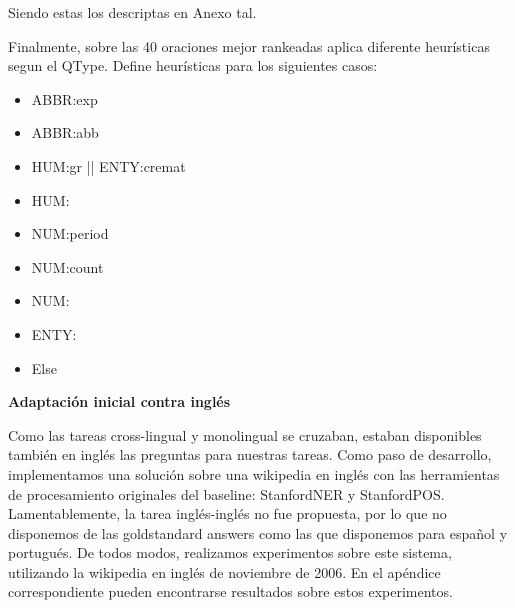 Siendo estas los descriptas en Anexo tal.

Finalmente, sobre las 40 oraciones mejor rankeadas aplica diferente heurísticas segun el QType.
Define heurísticas para los siguientes casos:
\begin{itemize}
  \item ABBR:exp
  \item ABBR:abb
	\item HUM:gr || ENTY:cremat
  \item HUM:
  \item NUM:period
  \item NUM:count
  \item NUM:
  \item ENTY:
  \item Else
\end{itemize}

\textbf{Adaptación inicial contra inglés}

Como las tareas cross-lingual y monolingual se cruzaban, estaban disponibles también en inglés las preguntas para nuestras tareas. 
Como paso de desarrollo, implementamos una solución sobre una wikipedia en inglés con las herramientas de procesamiento originales del baseline: StanfordNER y StanfordPOS. Lamentablemente, la tarea inglés-inglés no fue propuesta, por lo que no disponemos de las goldstandard answers como las que disponemos para español y portugués. De todos modos, realizamos experimentos sobre este sistema, utilizando la wikipedia en inglés de noviembre de 2006. En el apéndice correspondiente pueden encontrarse resultados sobre estos experimentos.


